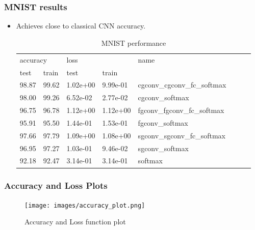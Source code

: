 \documentclass{beamer}
\begin{document}
\begin{frame}
  \frametitle{MNIST results}
  \begin{itemize}
  \item Achieves close to classical CNN accuracy.
    \begin{table}[H]
      \centering
      \caption{MNIST performance}
      \label{t:mn_perf}
      \begin{tabular}{|l|l|l|l|l|l|l|l|}
        \hline
        \multicolumn{2}{|l|}{accuracy} & \multicolumn{2}{l|}{loss} & \multirow{2}{*}{name}       \\ \cline{1-4}
        test           & train         & test        & train       &                             \\ \hline
        98.87          & 99.62         & 1.02e+00    & 9.99e-01    & cgconv\_cgconv\_fc\_softmax \\ \hline
        98.00          & 99.26         & 6.52e-02    & 2.77e-02    & cgconv\_softmax             \\ \hline
        96.75          & 96.78         & 1.12e+00    & 1.12e+00    & fgconv\_fgconv\_fc\_softmax \\ \hline
        95.91          & 95.50         & 1.44e-01    & 1.53e-01    & fgconv\_softmax             \\ \hline
        97.66          & 97.79         & 1.09e+00    & 1.08e+00    & sgconv\_sgconv\_fc\_softmax \\ \hline
        96.95          & 97.27         & 1.03e-01    & 9.46e-02    & sgconv\_softmax             \\ \hline
        92.18          & 92.47         & 3.14e-01    & 3.14e-01    & softmax                     \\ \hline
      \end{tabular}
    \end{table}
\end{itemize}
\end{frame}

\begin{frame}
  \frametitle{Accuracy and Loss Plots}
  \begin{figure}[H]
    \centering
    \texttt{[image: images/accuracy\_plot.png]}
    \caption{Accuracy and Loss function plot}
    \label{fig:acl_mnist}
  \end{figure}

\end{frame}
\end{document}
